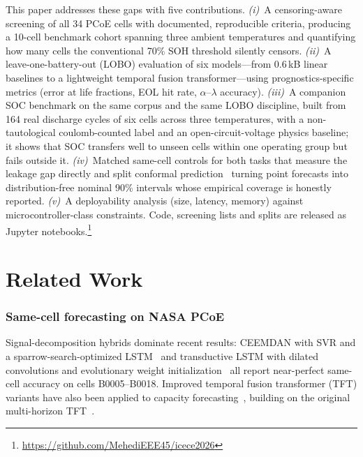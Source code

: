 \documentclass[conference,a4paper]{IEEEtran}
\begin{document}
This paper addresses these gaps with five contributions. \emph{(i)}~A
censoring-aware screening of all 34 PCoE cells with documented, reproducible
criteria, producing a 10-cell benchmark cohort spanning three ambient
temperatures and quantifying how many cells the conventional 70\% SOH
threshold silently censors. \emph{(ii)}~A leave-one-battery-out (LOBO)
evaluation of six models---from 0.6\,kB linear baselines to a lightweight
temporal fusion transformer---using prognostics-specific metrics (error at
life fractions, EOL hit rate, $\alpha$--$\lambda$ accuracy).
\emph{(iii)}~A companion SOC benchmark on the same corpus and the same LOBO
discipline, built from 164 real discharge cycles of six cells across three
temperatures, with a non-tautological coulomb-counted label and an
open-circuit-voltage physics baseline; it shows that SOC transfers well to
unseen cells within one operating group but fails outside it. \emph{(iv)}~Matched
same-cell controls for both tasks that measure the leakage gap directly and
split conformal prediction~\cite{lei2018} turning point forecasts into
distribution-free nominal 90\% intervals whose empirical coverage is honestly
reported. \emph{(v)}~A deployability analysis (size, latency, memory) against
microcontroller-class constraints. Code, screening lists and splits are
released as Jupyter notebooks.\footnote{\url{https://github.com/MehediEEE45/icece2026}}

\section{Related Work}
\subsubsection*{Same-cell forecasting on NASA PCoE}
Signal-decomposition hybrids dominate recent results: CEEMDAN with SVR and a
sparrow-search-optimized LSTM~\cite{ceemdan2025} and transductive
LSTM with dilated convolutions and evolutionary weight
initialization~\cite{tlstm2025} all report near-perfect same-cell accuracy on
cells B0005--B0018. Improved temporal fusion transformer (TFT) variants have also been applied to
capacity forecasting~\cite{tftenergy2024}, building on the original
multi-horizon TFT~\cite{lim2021}.
\end{document}
